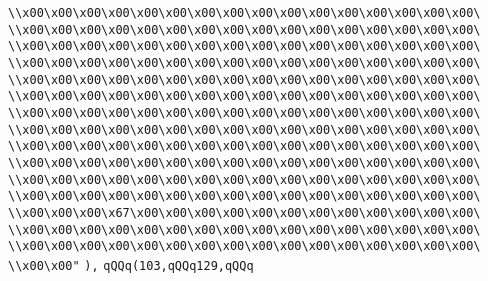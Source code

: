 \verb|\\x00\x00\x00\x00\x00\x00\x00\x00\x00\x00\x00\x00\x00\x00\x00\x00\|\newline
\verb|\\x00\x00\x00\x00\x00\x00\x00\x00\x00\x00\x00\x00\x00\x00\x00\x00\|\newline
\verb|\\x00\x00\x00\x00\x00\x00\x00\x00\x00\x00\x00\x00\x00\x00\x00\x00\|\newline
\verb|\\x00\x00\x00\x00\x00\x00\x00\x00\x00\x00\x00\x00\x00\x00\x00\x00\|\newline
\verb|\\x00\x00\x00\x00\x00\x00\x00\x00\x00\x00\x00\x00\x00\x00\x00\x00\|\newline
\verb|\\x00\x00\x00\x00\x00\x00\x00\x00\x00\x00\x00\x00\x00\x00\x00\x00\|\newline
\verb|\\x00\x00\x00\x00\x00\x00\x00\x00\x00\x00\x00\x00\x00\x00\x00\x00\|\newline
\verb|\\x00\x00\x00\x00\x00\x00\x00\x00\x00\x00\x00\x00\x00\x00\x00\x00\|\newline
\verb|\\x00\x00\x00\x00\x00\x00\x00\x00\x00\x00\x00\x00\x00\x00\x00\x00\|\newline
\verb|\\x00\x00\x00\x00\x00\x00\x00\x00\x00\x00\x00\x00\x00\x00\x00\x00\|\newline
\verb|\\x00\x00\x00\x00\x00\x00\x00\x00\x00\x00\x00\x00\x00\x00\x00\x00\|\newline
\verb|\\x00\x00\x00\x00\x00\x00\x00\x00\x00\x00\x00\x00\x00\x00\x00\x00\|\newline
\verb|\\x00\x00\x00\x67\x00\x00\x00\x00\x00\x00\x00\x00\x00\x00\x00\x00\|\newline
\verb|\\x00\x00\x00\x00\x00\x00\x00\x00\x00\x00\x00\x00\x00\x00\x00\x00\|\newline
\verb|\\x00\x00\x00\x00\x00\x00\x00\x00\x00\x00\x00\x00\x00\x00\x00\x00\|\newline
\verb|\\x00\x00"|\newline
\verb|),|\newline
\verb|qQQq(103,qQQq129,qQQq|\newline
